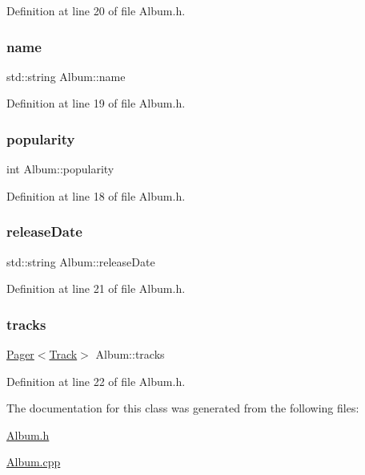 Definition at line 20 of file Album.\+h.

\mbox{\label{class_album_a3467537690b1465e740fdfd12d076ac9}} 
\subsubsection{\texorpdfstring{name}{name}}
{\footnotesize\ttfamily std\+::string Album\+::name\hspace{0.3cm}{\ttfamily [private]}}



Definition at line 19 of file Album.\+h.

\mbox{\label{class_album_a03460cab9bc5879e89f1c7969d6bf442}} 
\subsubsection{\texorpdfstring{popularity}{popularity}}
{\footnotesize\ttfamily int Album\+::popularity\hspace{0.3cm}{\ttfamily [private]}}



Definition at line 18 of file Album.\+h.

\mbox{\label{class_album_a0623e76931455275275a9fc1dd2e7e1f}} 
\subsubsection{\texorpdfstring{release\+Date}{releaseDate}}
{\footnotesize\ttfamily std\+::string Album\+::release\+Date\hspace{0.3cm}{\ttfamily [private]}}



Definition at line 21 of file Album.\+h.

\mbox{\label{class_album_ac60f912bb1c8e57c02feb77c3cc6d239}} 
\subsubsection{\texorpdfstring{tracks}{tracks}}
{\footnotesize\ttfamily \mbox{\hyperlink{class_pager}{Pager}}$<$\mbox{\hyperlink{class_track}{Track}}$>$ Album\+::tracks\hspace{0.3cm}{\ttfamily [private]}}



Definition at line 22 of file Album.\+h.



The documentation for this class was generated from the following files\+:\begin{DoxyCompactItemize}
\item 
\mbox{\hyperlink{_album_8h}{Album.\+h}}\item 
\mbox{\hyperlink{_album_8cpp}{Album.\+cpp}}\end{DoxyCompactItemize}
